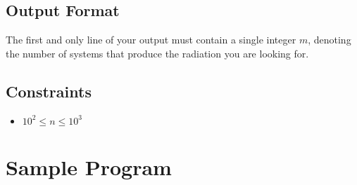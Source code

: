 \documentclass[12pt]{report}
\begin{document}
	\subsection*{Output Format}
	The first and only line of your output must contain a single integer $m$, denoting the number of systems that produce the radiation you are looking for.
	
	\subsection*{Constraints}
	\begin{itemize}
		\item $ 10^2 \le n \le 10^3 $
	\end{itemize}

\section*{Sample Program}
	
	
\end{document}
